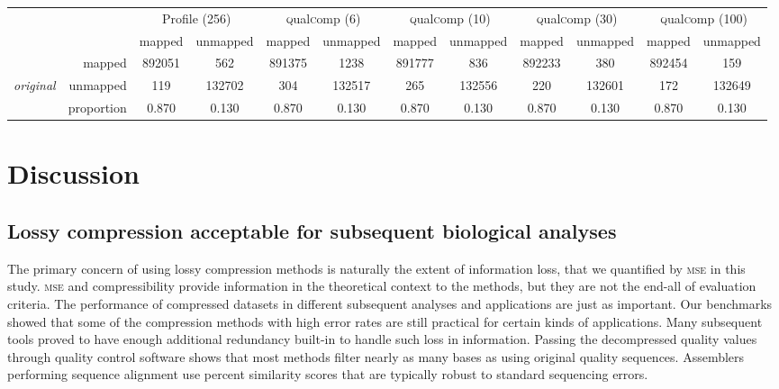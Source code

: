 \begin{table}[!tbhp]
\bigskip

\begin{tabular}{lr|cc|cc|cc|cc|cc}
&  & \multicolumn{2}{c|}{Profile (256)} & \multicolumn{2}{c|}{\textsc{q}ual\textsc{c}omp (6)} & \multicolumn{2}{c|}{\textsc{q}ual\textsc{c}omp (10)} & \multicolumn{2}{c|}{\textsc{q}ual\textsc{c}omp (30)} & \multicolumn{2}{c}{\textsc{q}ual\textsc{c}omp (100)} \\
& &  mapped & unmapped & mapped & unmapped & mapped & unmapped & mapped & unmapped & mapped & unmapped \\
\cline{2-12}
& mapped & 892051 & 562 & 891375 & 1238 & 891777 & 836 & 892233 & 380 & 892454 & 159 \\
{\em original}  & unmapped & 119 & 132702 & 304 & 132517 & 265 & 132556 & 220 & 132601 & 172 & 132649 \\
\cline{2-12}
& proportion & 0.870 & 0.130 & 0.870 & 0.130 & 0.870 & 0.130 & 0.870 & 0.130 & 0.870 & 0.130 \\

\end{tabular}

\label{tab:aligner}
\end{table}


\section{Discussion}

\subsection{Lossy compression acceptable for subsequent biological analyses}

The primary concern of using lossy compression methods is naturally
the extent of information loss, that we quantified by \textsc{mse} in
this study. \textsc{mse} and compressibility provide information in
the theoretical context to the methods, but they are not the end-all
of evaluation criteria. The performance of compressed datasets in
different subsequent analyses and applications are just as
important. Our benchmarks showed that some of the compression methods
with high error rates are still practical for certain kinds of
applications. Many subsequent tools proved to have enough additional
redundancy built-in to handle such loss in information. Passing the
decompressed quality values through quality control software shows
that most methods filter nearly as many bases as using original
quality sequences. Assemblers performing sequence alignment use
percent similarity scores that are typically robust to standard
sequencing errors.

